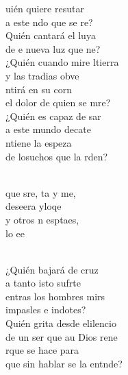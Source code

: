 \begin{cancion}%
	uién quiere resutar \\
	a este ndo que se re?\\
	Quién cantará el luya\\
	de e nueva luz que ne?\\
	¿Quién cuando mire ltierra \\
	y las tradias obve\\
	ntirá en su corn  \\
	el dolor de quien se mre?\\
	¿Quién es capaz de sar \\
	a este mundo decate\\
	ntiene la espeza \\
	de losuchos que la rden?\\\jump\\
	\begin{chorus}%
	que sre, ta y me, \\
	deseera yloqe\\
	y otros n esptaes, \\
	lo ee\\
	\end{chorus}%
	\jump\\
	¿Quién bajará de  cruz \\
	a tanto isto sufrte\\
	entras los hombres mirs \\
	impasles e indotes?\\
	Quién grita desde elilencio \\
	de un ser que au Dios rene\\
	rque se hace para \\
	que sin hablar se la entnde?\\

\end{cancion}
